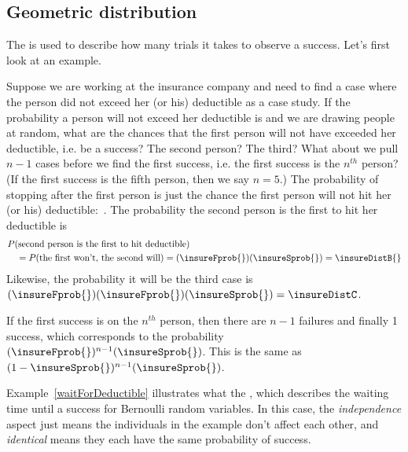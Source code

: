 


\subsection{Geometric distribution}


The 
is used to describe how
many trials it takes to observe a success.
Let's first look at an example.

\begin{examplewrap}
\begin{nexample}{Suppose we are working at the insurance
    company and need to find a case where the person did
    not exceed her (or his) deductible as a case study.
    If the probability a person will not exceed her
    deductible is \insureSprob{} and we are drawing people
    at random, what are the chances that the first person
    will not have exceeded her deductible, i.e. be a success?
    The second person?
    The third?
    What about we pull $n - 1$ cases before we find
    the first success, i.e. the first success is the
    $n^{th}$ person?
    (If the first success is the fifth person, then we say $n=5$.)}
  \label{waitForDeductible}%
  The probability of stopping after the first person is just
  the chance the first person will not hit her (or his)
  deductible:~\insureSprob{}.
The probability the second person is the first to hit
  her deductible is  \begin{align*}
  &P(\text{second person is the first to hit deductible})  \\
  &\quad
    = P(\text{the first won't, the second will})
    = (\insureFprob{})(\insureSprob{})
    = \insureDistB{}
  \end{align*}
  Likewise, the probability it will be the third case is
  $(\insureFprob{})(\insureFprob{})(\insureSprob{})
    = \insureDistC$.

  If the first success is on the $n^{th}$ person,
  then there are $n-1$ failures and finally 1 success,
  which corresponds to the probability
  $(\insureFprob{})^{n-1}(\insureSprob{})$.
  This is the same as
  $(1-\insureSprob{})^{n-1}(\insureSprob{})$.
\end{nexample}
\end{examplewrap}

Example~\ref{waitForDeductible} illustrates what the
,
which describes the waiting
time until a success for
Bernoulli random variables.
In this case, the \emph{independence} aspect just means
the individuals in the example don't affect each other,
and \emph{identical} means they each have the same probability
of success.


